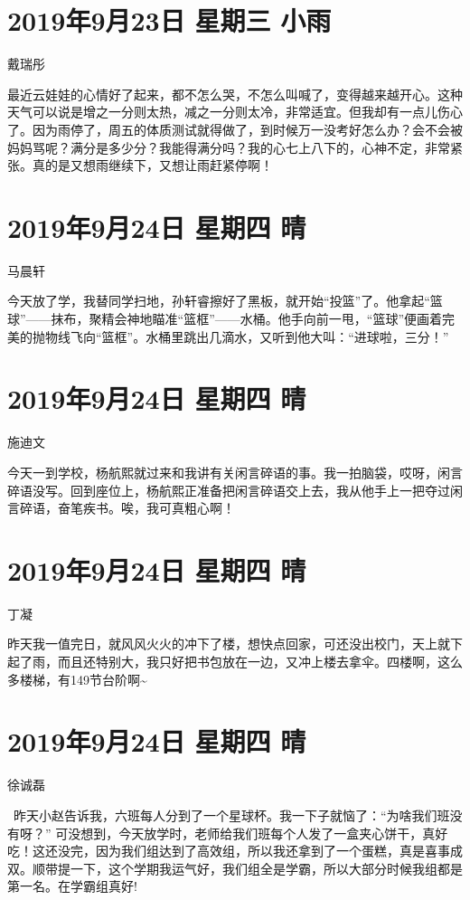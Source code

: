 \section{2019年9月23日 星期三 小雨}

戴瑞彤

最近云娃娃的心情好了起来，都不怎么哭，不怎么叫喊了，变得越来越开心。这种天气可以说是增之一分则太热，减之一分则太冷，非常适宜。但我却有一点儿伤心了。因为雨停了，周五的体质测试就得做了，到时候万一没考好怎么办？会不会被妈妈骂呢？满分是多少分？我能得满分吗？我的心七上八下的，心神不定，非常紧张。真的是又想雨继续下，又想让雨赶紧停啊！

\section{2019年9月24日 星期四 晴}

马晨轩

今天放了学，我替同学扫地，孙轩睿擦好了黑板，就开始``投篮''了。他拿起``篮球''------抹布，聚精会神地瞄准``篮框''------水桶。他手向前一甩，``篮球''便画着完美的抛物线飞向``篮框''。水桶里跳出几滴水，又听到他大叫：``进球啦，三分！''

\section{2019年9月24日 星期四 晴}

施迪文

今天一到学校，杨航熙就过来和我讲有关闲言碎语的事。我一拍脑袋，哎呀，闲言碎语没写。回到座位上，杨航熙正准备把闲言碎语交上去，我从他手上一把夺过闲言碎语，奋笔疾书。唉，我可真粗心啊！

\section{2019年9月24日 星期四 晴}

丁凝

昨天我一值完日，就风风火火的冲下了楼，想快点回家，可还没出校门，天上就下起了雨，而且还特别大，我只好把书包放在一边，又冲上楼去拿伞。四楼啊，这么多楼梯，有149节台阶啊\textasciitilde{}

\section{2019年9月24日 星期四 晴}

徐诚磊

~昨天小赵告诉我，六班每人分到了一个星球杯。我一下子就恼了：``为啥我们班没有呀？''
可没想到，今天放学时，老师给我们班每个人发了一盒夹心饼干，真好吃！这还没完，因为我们组达到了高效组，所以我还拿到了一个蛋糕，真是喜事成双。顺带提一下，这个学期我运气好，我们组全是学霸，所以大部分时候我组都是第一名。在学霸组真好!

